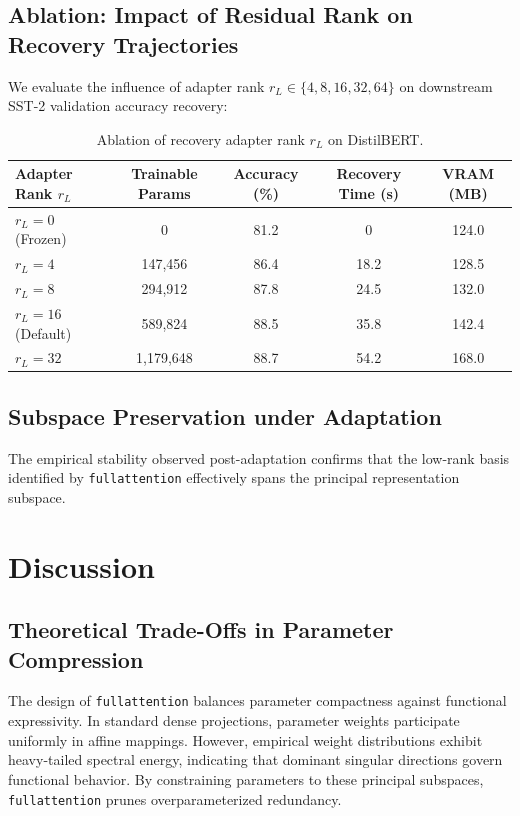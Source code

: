 {\subsection{Ablation: Impact of Residual Rank on Recovery Trajectories}
We evaluate the influence of adapter rank $r_L \in \{4, 8, 16, 32, 64\}$ on downstream SST-2 validation accuracy recovery:
\begin{table}[H]
\centering
\small
\begin{tabular}{lcccc}
\toprule
\textbf{Adapter Rank $r_L$} & \textbf{Trainable Params} & \textbf{Accuracy (\%)} & \textbf{Recovery Time (s)} & \textbf{VRAM (MB)} \\
\midrule
$r_L = 0$ (Frozen) & 0 & 81.2 & 0 & 124.0 \\
$r_L = 4$ & 147,456 & 86.4 & 18.2 & 128.5 \\
$r_L = 8$ & 294,912 & 87.8 & 24.5 & 132.0 \\
$r_L = 16$ (Default) & 589,824 & 88.5 & 35.8 & 142.4 \\
$r_L = 32$ & 1,179,648 & 88.7 & 54.2 & 168.0 \\
\bottomrule
\end{tabular}
\caption{Ablation of recovery adapter rank $r_L$ on DistilBERT.}
\label{tab:ablation_adapter_rank}
\end{table}

\subsection{Subspace Preservation under Adaptation}
The empirical stability observed post-adaptation confirms that the low-rank basis identified by \texttt{fullattention} effectively spans the principal representation subspace.


\section{Discussion}

\subsection{Theoretical Trade-Offs in Parameter Compression}
The design of \texttt{fullattention} balances parameter compactness against functional expressivity. In standard dense projections, parameter weights participate uniformly in affine mappings. However, empirical weight distributions exhibit heavy-tailed spectral energy, indicating that dominant singular directions govern functional behavior. By constraining parameters to these principal subspaces, \texttt{fullattention} prunes overparameterized redundancy.

}
